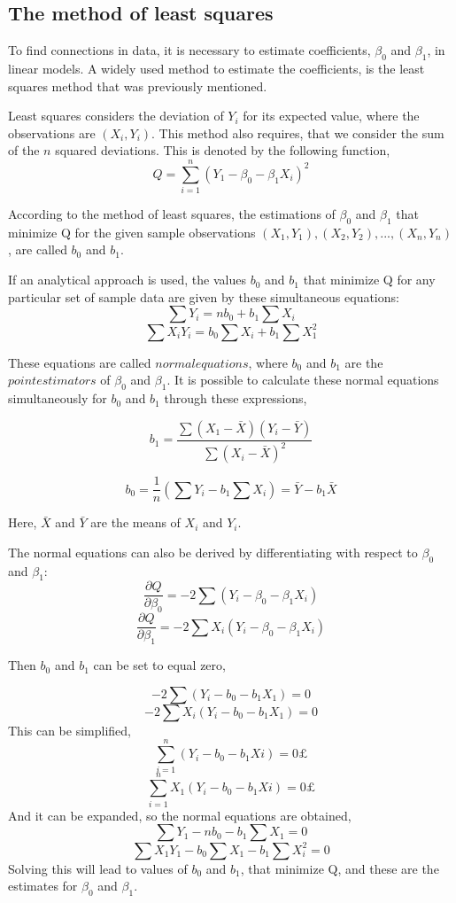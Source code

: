 \subsection{The method of least squares}
	To find connections in data, it is necessary to estimate coefficients, $\beta_0$ and $\beta_1$, in linear models. 
A widely used method to estimate the coefficients, is the least squares method that was previously mentioned. 

Least squares considers the deviation of $Y_i$ for  its expected value, where the observations are $(X_i, Y_i)$. 
This method also requires, that we consider the sum of the $n$ squared deviations.
This is denoted by the following function,
$$Q=\sum_{i=1}^{n}(Y_1-\beta_0 - \beta_1 X_i)^2$$

According to the method of least squares, the estimations of $\beta_0$ and $\beta_1$ that minimize Q for the given sample observations $(X_1,Y_1), (X_2,Y_2), ..., (X_n,Y_n)$, are called $b_0$ and $b_1$.  

If an analytical approach is used, the values $b_0$ and $b_1$ that minimize Q for any particular set of sample data are given by these simultaneous equations: 
$$\sum Y_i =n b_0 +b_1 \sum X_i$$
$$\sum X_i Y_i = b_0 \sum X_i + b_1 \sum X_1^2$$

These equations are called $normal equations$, where $b_0$ and $b_1$ are the $point estimators$ of $\beta_0$ and $\beta_1$. It is possible to calculate these normal equations simultaneously for $b_0$ and $b_1$ through these expressions,

$$b_1 = \frac{\sum (X_1 - \bar{X}) (Y_i - \bar{Y})}{\sum (X_i - \bar{X})^2}$$

$$b_0 = \frac{1}{n} (\sum Y_i - b_1 \sum X_i ) = \bar{Y} - b_1 \bar{X}$$

Here, $\bar{X}$ and $\bar{Y}$ are the means of $X_i$ and $Y_i$.

The normal equations can also be derived by differentiating with respect to $\beta_0$ and $\beta_1$:
$$\frac{\partial Q}{\partial \beta_0}=-2 \sum (Y_i - \beta_0 - \beta_1 X_i)$$
$$\frac{\partial Q} {\partial \beta_1} = -2 \sum X_i (Y_i - \beta_0 - \beta_1 X_i)$$

Then $b_0$ and $b_1$ can be set to equal zero, 

$$-2 \sum (Y_i - b_0 - b_1 X_1)=0$$
$$-2\sum X_i(Y_i - b_0 - b_1 X_1)=0$$
This can be simplified, 
$$\sum_{i=1}^{n} (Y_i - b_0 - b_1 Xi)=0£$$
$$\sum_{i=1}^{n} X_1(Y_i - b_0 - b_1 Xi)=0£$$
And it can be expanded, so the normal equations are obtained, 
$$\sum Y_1 - n b_0 - b_1 \sum X_1 =0$$
$$\sum X_1 Y_1  - b_0 \sum X_1 - b_1 \sum X_i^2 =0$$
Solving this will lead to values of $b_0$ and $b_1$, that minimize Q, and these are the estimates for $\beta_0$ and $\beta_1$. 

